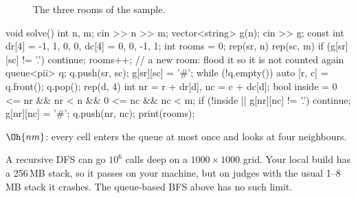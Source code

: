 \begin{figure}[H]
\centering
{}
\caption{The three rooms of the sample.}
\end{figure}

\begin{code}
void solve() {
    int n, m;
    cin >> n >> m;
    vector<string> g(n);
    cin >> g;
    const int dr[4] = {-1, 1, 0, 0}, dc[4] = {0, 0, -1, 1};
    int rooms = 0;
    rep(sr, n) rep(sc, m) {
        if (g[sr][sc] != '.') continue;
        rooms++;  // a new room: flood it so it is not counted again
        queue<pii> q;
        q.push({sr, sc});
        g[sr][sc] = '#';
        while (!q.empty()) {
            auto [r, c] = q.front();
            q.pop();
            rep(d, 4) {
                int nr = r + dr[d], nc = c + dc[d];
                bool inside = 0 <= nr && nr < n && 0 <= nc && nc < m;
                if (!inside || g[nr][nc] != '.') continue;
                g[nr][nc] = '#';
                q.push({nr, nc});
            }
        }
    }
    print(rooms);
}
\end{code}

 $\Oh{nm}$: every cell enters the queue at most once and looks at four neighbours.

\begin{pitfall}
A recursive DFS can go $10^6$ calls deep on a $1000\times1000$ grid. Your local build has a 256\,MB stack, so it passes on
your machine, but on judges with the usual 1--8\,MB stack it crashes. The queue-based BFS above has no such limit.
\end{pitfall}

